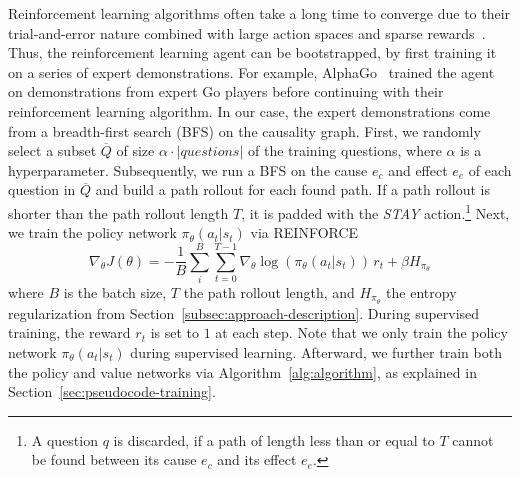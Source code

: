 Reinforcement learning algorithms often take a long time to converge due to their trial-and-error nature combined with large action spaces and sparse rewards~\cite{Xiong2017DeePpath, Lin2020RewardShaping}. Thus, the reinforcement learning agent can be bootstrapped, by first training it on a series of expert demonstrations. For example, AlphaGo~\cite{Silver2016AlphaGO} trained the agent on demonstrations from expert Go players before continuing with their reinforcement learning algorithm. In our case, the expert demonstrations come from a breadth-first search (BFS) on the causality graph. First, we randomly select a subset $\overline{Q}$ of size $\alpha \cdot |questions|$  of the training questions, where $\alpha$ is a hyperparameter. Subsequently, we run a BFS on the cause $e_c$ and effect $e_e$ of each question in $\overline{Q}$ and build a path rollout for each found path. If a path rollout is shorter than the path rollout length $T$, it is padded with the \textit{STAY} action.\footnote{A question $q$ is discarded, if a path of length less than or equal to $T$ cannot be found between its cause $e_c$ and its effect $e_e$.} Next, we train the policy network $\pi_{\theta}(a_t | s_t)$ via REINFORCE
\begin{equation}
  \nabla_{\theta} J(\theta) = - \frac{1}{B} \sum_{i}^{B} \sum_{t=0}^{T-1} \nabla_{\theta} \log(\pi_{\theta} (a_t | s_t)) \, r_t + \beta H_{\pi_\theta}
\end{equation}
where $B$ is the batch size, $T$ the path rollout length, and $H_{\pi_\theta}$ the entropy regularization from Section~\ref{subsec:approach-description}. During supervised training, the reward $r_t$ is set to $1$ at each step. Note that we only train the policy network $\pi_{\theta}(a_t | s_t)$ during supervised learning. Afterward, we further train both the policy and value networks via Algorithm~\ref{alg:algorithm}, as explained in Section~\ref{sec:pseudocode-training}.
